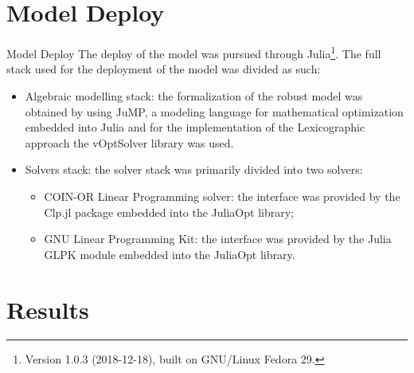 \documentclass[10pt]{beamer}
\begin{document}
\section{Model Deploy}

\begin{frame}{Model Deploy}
The deploy of the model was pursued through Julia\footnote{Version 1.0.3 (2018-12-18), built on GNU/Linux Fedora 29.}\cite{bezanson17}. The full stack used for the deployment of the model was divided as such:
\begin{itemize}
\item Algebraic modelling stack: the formalization of the robust model was obtained by using JuMP\cite{dunning17}\cite{lubin15}, a modeling language for mathematical optimization embedded into Julia and for the implementation of the Lexicographic approach the vOptSolver\cite{xavier17} library was used.
\item Solvers stack: the solver stack was primarily divided into two solvers:
  \begin{itemize}
  \item COIN-OR\cite{heimer2003} Linear Programming solver: the interface was provided by the Clp.jl package embedded into the JuliaOpt library;
  \item GNU Linear Programming Kit: the interface was provided by the Julia GLPK module embedded into the JuliaOpt library.
  \end{itemize}
\end{itemize}
\end{frame}

\section{Results}
\end{document}
